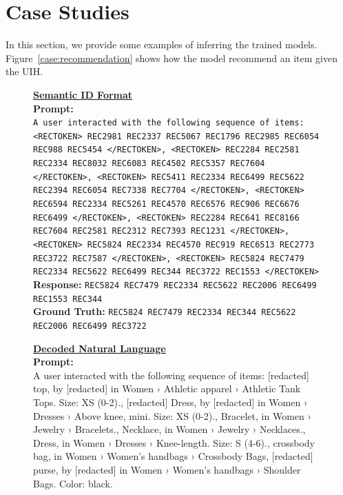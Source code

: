 \documentclass[]{fairmeta}
\begin{document}
\section{Case Studies}
In this section, we provide some examples of inferring the trained models. Figure~\ref{case:recommendation} shows how the model recommend an item given the UIH.
\begin{figure}[H]
  \begin{tcolorbox}[title={\textbf{Case Study: Recommendation given UIH}},
                    colback=white, colframe=black!70]
  \begin{minipage}[t]{0.48\textwidth}
  \textbf{\underline{Semantic ID Format}}\\[0.5em]
  \textbf{Prompt:}\\
  {\footnotesize\texttt{A user interacted with the following sequence of items: <RECTOKEN> REC2981 REC2337 REC5067 REC1796 REC2985 REC6054 REC988 REC5454 </RECTOKEN>, <RECTOKEN> REC2284 REC2581 REC2334 REC8032 REC6083 REC4502 REC5357 REC7604 </RECTOKEN>, <RECTOKEN> REC5411 REC2334 REC6499 REC5622 REC2394 REC6054 REC7338 REC7704 </RECTOKEN>, <RECTOKEN> REC6594 REC2334 REC5261 REC4570 REC6576 REC906 REC6676 REC6499 </RECTOKEN>, <RECTOKEN> REC2284 REC641 REC8166 REC7604 REC2581 REC2312 REC7393 REC1231 </RECTOKEN>, <RECTOKEN> REC5824 REC2334 REC4570 REC919 REC6513 REC2773 REC3722 REC7587 </RECTOKEN>, <RECTOKEN> REC5824 REC7479 REC2334 REC5622 REC6499 REC344 REC3722 REC1553 </RECTOKEN>}}\\[0.3em]
  \textbf{Response:} {\footnotesize\texttt{REC5824 REC7479 REC2334 REC5622 REC2006 REC6499 REC1553 REC344}}\\
  \textbf{Ground Truth:} {\footnotesize\texttt{REC5824 REC7479 REC2334 REC344 REC5622 REC2006 REC6499 REC3722}}
  \end{minipage}
  \hfill
  \begin{minipage}[t]{0.48\textwidth}
  \textbf{\underline{Decoded Natural Language}}\\[0.5em]
  \textbf{Prompt:}\\
  {\footnotesize A user interacted with the following sequence of items: [redacted] top, by [redacted] in Women › Athletic apparel › Athletic Tank Tops. Size: XS (0-2)., [redacted] Dress, by [redacted] in Women › Dresses › Above knee, mini. Size: XS (0-2)., Bracelet, in Women › Jewelry › Bracelets., Necklace, in Women › Jewelry › Necklaces., Dress, in Women › Dresses › Knee-length. Size: S (4-6)., crossbody bag, in Women › Women's handbags › Crossbody Bags, [redacted] purse, by [redacted] in Women › Women's handbags › Shoulder Bags. Color: black.}\\[0.3em]

\end{minipage}
\end{tcolorbox}
\end{figure}
\end{document}
